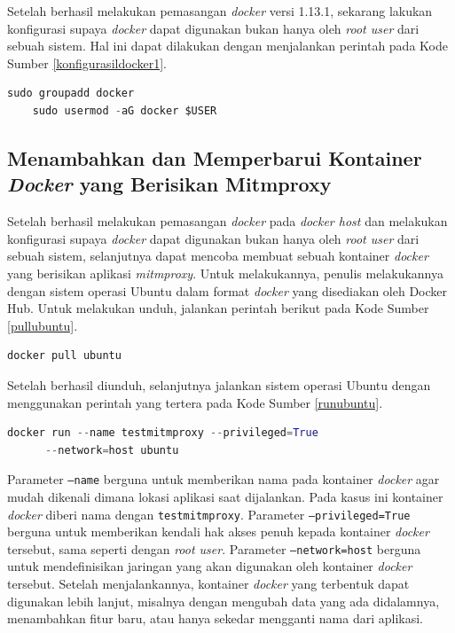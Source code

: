  Setelah berhasil melakukan pemasangan \textit{docker} versi 1.13.1, sekarang lakukan konfigurasi supaya \textit{docker} dapat digunakan bukan hanya oleh \textit{root user} dari sebuah sistem. Hal ini dapat dilakukan dengan menjalankan perintah pada Kode Sumber \ref{konfigurasildocker1}.
  \newline
    \begin{minipage}{\linewidth}
	\begin{lstlisting}[caption=Perintah untuk installasi Ansible,language=Python,label=konfigurasildocker1]
	sudo groupadd docker
	sudo usermod -aG docker $USER
	\end{lstlisting}
	\end{minipage}
	
  \subsection{Menambahkan dan Memperbarui Kontainer \textit{Docker} yang Berisikan Mitmproxy}
  Setelah berhasil melakukan pemasangan \textit{docker} pada \textit{docker host} dan melakukan konfigurasi supaya \textit{docker} dapat digunakan bukan hanya oleh \textit{root user} dari sebuah sistem, selanjutnya dapat mencoba membuat sebuah kontainer \textit{docker} yang berisikan aplikasi \textit{mitmproxy}. Untuk melakukannya, penulis melakukannya dengan sistem operasi Ubuntu dalam format \textit{docker} yang disediakan oleh Docker Hub. Untuk melakukan unduh, jalankan perintah berikut pada Kode Sumber \ref{pullubuntu}.
  \newline
  \begin{minipage}{\linewidth}
  \begin{lstlisting}[caption=Perintah untuk \textit{Pull} Ubuntu,language=Python,label=pullubuntu]
  docker pull ubuntu
  \end{lstlisting}
  \end{minipage}
  Setelah berhasil diunduh, selanjutnya jalankan sistem operasi Ubuntu dengan menggunakan perintah yang tertera pada Kode Sumber \ref{runubuntu}.
  \newline
  \begin{minipage}{\linewidth}
  \begin{lstlisting}[caption=Perintah untuk Menjalankan \textit{Image} Ubuntu,language=Python,label=runubuntu]
  docker run --name testmitmproxy --privileged=True 
 	  --network=host ubuntu
  \end{lstlisting}
  \end{minipage}
	Parameter \texttt{--name} berguna untuk memberikan nama pada kontainer \textit{docker} agar mudah dikenali dimana lokasi aplikasi saat dijalankan. Pada kasus ini kontainer \textit{docker} diberi nama dengan \texttt{testmitmproxy}. Parameter \texttt{--privileged=True} berguna untuk memberikan kendali hak akses penuh kepada kontainer \textit{docker} tersebut, sama seperti dengan \textit{root user}. Parameter \texttt{--network=host} berguna untuk mendefinisikan jaringan yang akan digunakan oleh kontainer \textit{docker} tersebut. Setelah menjalankannya, kontainer \textit{docker} yang terbentuk dapat digunakan lebih lanjut, misalnya dengan mengubah data yang ada didalamnya, menambahkan fitur baru, atau hanya sekedar mengganti nama dari aplikasi.\\
